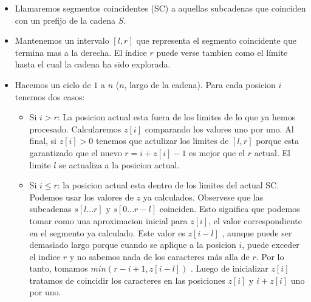 \begin{itemize}
    \item{
        Llamaremos segmentos coincidentes (SC) a aquellas subcadenas que 
        coinciden con un prefijo de la cadena $S$.
    }
    \item{Mantenemos un intervalo $[l, r]$ que representa el segmento 
        coincidente que termina mas a la derecha. El \'indice $r$ puede 
        verse tambien como el l\'imite hasta el cual la cadena ha sido 
        explorada.
    }

    \item{
        Hacemos un ciclo de $1$ a $n$ ($n$, largo de la cadena). Para 
        cada posicion $i$ tenemos dos casos:
        \begin{itemize}
            \item{
                Si $i>r$: La posicion actual esta fuera de los limites 
                de lo que ya hemos procesado. Calcularemos $z[i]$ comparando 
                los valores uno por uno. Al final, si $z [ i ] >0$ tenemos 
                que actulizar los limites de $[ l ,r ]$ porque esta garantizado 
                que el nuevo $r =i+ z [ i ] - 1$ es mejor que el $r$ actual. 
                El limite $l$ se actualiza a la posicion actual.
            }
            \item{
                Si $i \leq r$: la posicion actual esta dentro de los limites 
                del actual SC. Podemos usar los valores de $z$ ya calculados.
                Observese que las subcadenas $s [ l... r ]$ y $s [ 0... r - l ]$ 
                coinciden. Esto significa que podemos tomar como una aproximacion 
                inicial para $z [ i ]$, el valor correspondiente en el segmento 
                ya calculado. Este valor es $z [ i - l ]$ , aunque puede ser 
                demasiado largo porque cuando se aplique a la posicion $i$, 
                puede exceder el indice $r$ y no sabemos nada de los caracteres 
                m\'as alla de $r$. Por lo tanto, tomamos 
                $min ( r - i+1, z [ i - l ] )$ . Luego de inicializar $z [ i ]$ 
                tratamos de coincidir los caracteres en las posiciones $z [ i ]$ 
                y $i+ z [ i ]$ uno por uno.
            }
        \end{itemize}    
    }
\end{itemize}
